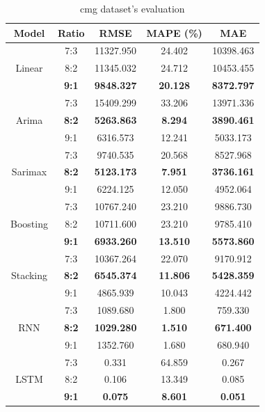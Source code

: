 \documentclass[conference]{IEEEtran}
\begin{document}
\begin{table}[H]
    \centering
    \caption{cmg dataset's evaluation}
    \begin{tabular}{|c|c|c|c|c|}
    \hline
    \rule{0pt}{2ex}
        \centering Model & Ratio & RMSE & MAPE (\%) & MAE \\
        \hline
        \multirow{3}{*}{Linear} & 7:3 & 11327.950 & 24.402 & 10398.463 \\ 
         & 8:2 & 11345.032 & 24.712 & 10453.455 \\ 
         & \textbf{9:1} & \textbf{9848.327} & \textbf{20.128} & \textbf{8372.797} \\
         \hline
         \multirow{3}{*}{Arima} & 7:3 & 15409.299 & 33.206 & 13971.336 \\ 
         & \textbf{8:2} & \textbf{5263.863} & \textbf{8.294} & \textbf{3890.461} \\ 
         & 9:1 & 6316.573 & 12.241 & 5033.173 \\
         \hline
         \multirow{3}{*}{Sarimax} & 7:3 & 9740.535 & 20.568 & 8527.968 \\ 
         & \textbf{8:2} & \textbf{5123.173} & \textbf{7.951} & \textbf{3736.161} \\ 
         & 9:1 & 6224.125 & 12.050 & 4952.064 \\
         \hline
         \multirow{3}{*}{Boosting} & 7:3 & 10767.240 & 23.210 & 9886.730 \\ 
         & 8:2 & 10711.600 & 23.210 & 9785.410 \\ 
         & \textbf{9:1} & \textbf{6933.260} & \textbf{13.510} & \textbf{5573.860} \\
         \hline
         \multirow{3}{*}{Stacking} & 7:3 & 10367.264 & 22.070 & 9170.912 \\ 
         & \textbf{8:2} & \textbf{6545.374} & \textbf{11.806} & \textbf{5428.359} \\ 
         & 9:1 & 4865.939 & 10.043 & 4224.442 \\
         \hline
         \multirow{3}{*}{RNN} & 7:3 & 1089.680 & 1.800 & 759.330 \\ 
         & \textbf{8:2} & \textbf{1029.280} & \textbf{1.510} & \textbf{671.400} \\ 
         & 9:1 & 1352.760 & 1.680 & 680.940 \\
         \hline
         \multirow{3}{*}{LSTM} & 7:3 & 0.331 & 64.859 & 0.267 \\ 
         & 8:2 & 0.106 & 13.349 & 0.085 \\ 
         & \textbf{9:1} & \textbf{0.075} & \textbf{8.601} & \textbf{0.051} \\

\end{tabular}
\end{table}
\end{document}
